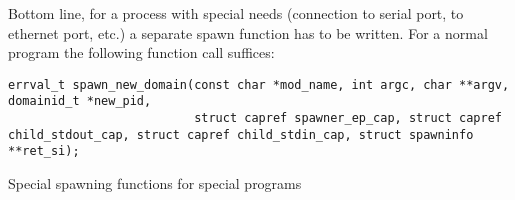 Bottom line, for a process with special needs (connection to serial port, to ethernet port, etc.) a separate spawn function has to be written. For a normal program the following function call suffices:

\begin{code}
\begin{mdframed}[style=myframe]
\begin{verbatim}
errval_t spawn_new_domain(const char *mod_name, int argc, char **argv, domainid_t *new_pid,
                          struct capref spawner_ep_cap, struct capref child_stdout_cap, struct capref child_stdin_cap, struct spawninfo **ret_si);
\end{verbatim}
\end{mdframed}
\caption{Special spawning functions for special programs}
\newline
\label{code:spawn_specials}
\end{code}
